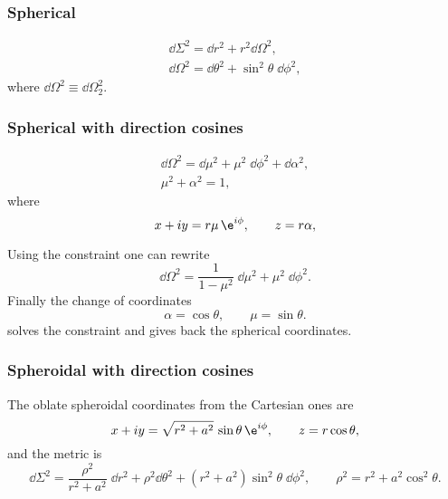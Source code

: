 \subsubsection{Spherical}

\begin{subequations}
\begin{gather}
	\dd \Sigma^2 = \dd r^2 + r^2 \dd \Omega^2, \\
	\dd \Omega^2 = \dd \theta^2 + \sin^2 \theta\; \dd \phi^2,
\end{gather}
\end{subequations}
where $\dd \Omega^2 \equiv \dd \Omega_2^2$.


\subsubsection{Spherical with direction cosines}

\begin{subequations}
\begin{gather}
	\dd \Omega^2 = \dd \mu^2 + \mu^2\; \dd \phi^2 + \dd \alpha^2, \\
	\mu^2 + \alpha^2 = 1,
\end{gather}
\end{subequations}
where
\begin{equation}
	x + iy = r \mu\, \e^{i\phi}, \qquad
	z = r \alpha,
\end{equation} 

Using the constraint one can rewrite
\begin{equation}
	\dd \Omega^2 = \frac{1}{1 - \mu^2}\; \dd \mu^2 + \mu^2\; \dd \phi^2.
\end{equation} 
Finally the change of coordinates
\begin{equation}
	\alpha = \cos \theta, \qquad
	\mu = \sin \theta.
\end{equation} 
solves the constraint and gives back the spherical coordinates.


\subsubsection{Spheroidal with direction cosines}

The oblate spheroidal coordinates from the Cartesian ones are~\cite[p.~15]{Visser:2009:KerrSpacetimeBrief}
\begin{equation}
	x + i y = \sqrt{r^2 + a^2}\, \sin \theta\, \e^{i\phi}, \qquad
	z = r \cos\theta,
\end{equation} 
and the metric is
\begin{equation}
	\label{coord:metric:4d:spheroidal}
	\dd \Sigma^2 = \frac{\rho^2}{r^2 + a^2}\; \dd r^2 + \rho^2 \dd\theta^2 + (r^2 + a^2) \sin^2 \theta\; \dd \phi^2, \qquad
	\rho^2 = r^2 + a^2 \cos^2 \theta.
\end{equation} 

